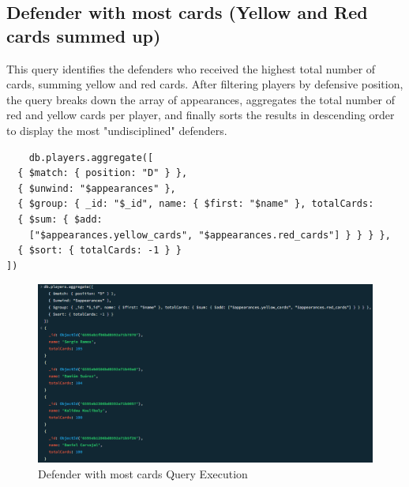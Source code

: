 \documentclass{Configuration_Files/PoliMi3i_thesis}
\begin{document}
\subsection{Defender with most cards (Yellow and Red cards summed up)}
This query identifies the defenders who received the highest total number of cards, summing yellow and red cards. After filtering players by defensive position, the query breaks down the array of appearances, aggregates the total number of red and yellow cards per player, and finally sorts the results in descending order to display the most "undisciplined" defenders.
\begin{verbatim}
    db.players.aggregate([
  { $match: { position: "D" } },
  { $unwind: "$appearances" },
  { $group: { _id: "$_id", name: { $first: "$name" }, totalCards: 
  { $sum: { $add: 
    ["$appearances.yellow_cards", "$appearances.red_cards"] } } } },
  { $sort: { totalCards: -1 } }
])
\end{verbatim}

\begin{figure}[htbp]
    \centering
    \includegraphics[scale=0.7]{Images/Queries/Defenders_most_cards/dmc.png}
    \caption{Defender with most cards  Query Execution}
\end{figure}
\end{document}
